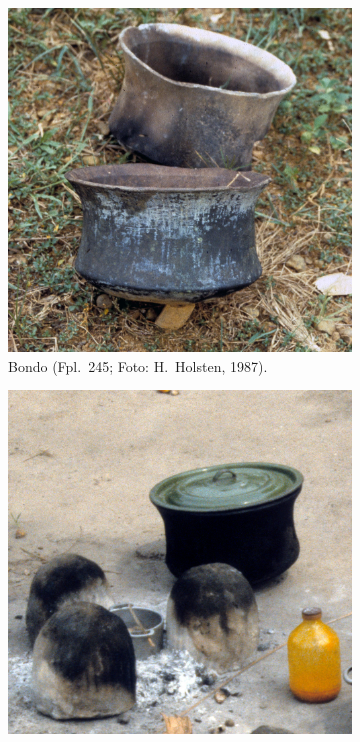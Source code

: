 \begin{figure}[p]
	\centering
	\begin{subfigure}{\columnwidth}
		\centering
		\includegraphics[width = \columnwidth]{fig/BOO87-101_HH87-II-18-27.jpg}
		\caption{Bondo (Fpl.~245; Foto: H.~Holsten, 1987).}
		\label{fig:BOO87-101}
	\end{subfigure}\hfill
	\begin{subfigure}{\columnwidth}
		\centering
		\includegraphics[width = \columnwidth]{fig/MIS87-101_E87-029-14_b.jpg}

\end{subfigure}
\end{figure}
